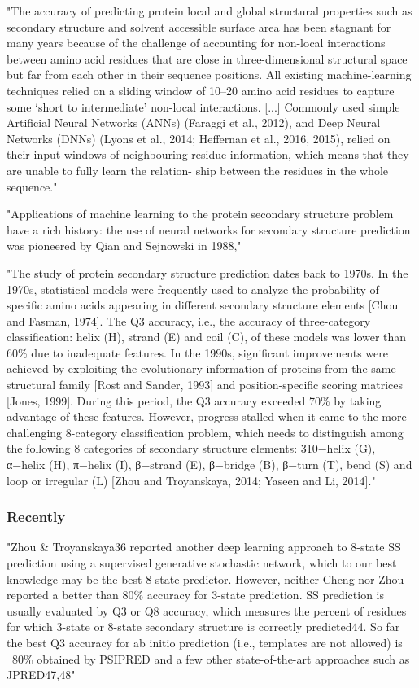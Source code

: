 	"The accuracy of predicting protein local and global structural properties such as secondary structure and solvent accessible surface area has been stagnant for many years because of the challenge of accounting for non-local interactions between amino acid residues that are close in three-dimensional structural space but far from each other in their sequence positions. All existing machine-learning techniques relied on a sliding window of 10–20 amino acid residues to capture some ‘short to intermediate’ non-local interactions. [...] Commonly used simple Artificial Neural Networks (ANNs) (Faraggi et al., 2012), and Deep Neural Networks (DNNs) (Lyons et al., 2014; Heffernan et al., 2016, 2015), relied on their input windows of neighbouring residue information, which means that they are unable to fully learn the relation- ship between the residues in the whole sequence." \cite{Heffernan2017}

	"Applications of machine learning to the protein secondary structure problem have a rich history: the use of neural networks for secondary structure prediction was pioneered by Qian and Sejnowski in 1988," \cite{Busia2017}
	
	"The study of protein secondary structure prediction dates back to 1970s. In the 1970s, statistical models were frequently used to analyze the probability of specific amino acids appearing in different secondary structure elements [Chou and Fasman, 1974]. The Q3 accuracy, i.e., the accuracy of three-category classification: helix (H), strand (E) and coil (C), of these models was lower than 60\% due to inadequate features. In the 1990s, significant improvements were achieved by exploiting the evolutionary information of proteins from the same structural family [Rost and Sander, 1993] and position-specific scoring matrices [Jones, 1999]. During this period, the Q3 accuracy exceeded 70\% by taking advantage of these features. However, progress stalled when it came to the more challenging 8-category classification problem, which needs to distinguish among the following 8 categories of secondary structure elements: 310−helix (G), α−helix (H), π−helix (I), β−strand (E), β−bridge (B), β−turn (T), bend (S) and loop or irregular (L) [Zhou and Troyanskaya, 2014; Yaseen and Li, 2014]." \cite{Li2016}

	\subsubsection{Recently}
	"Zhou \& Troyanskaya36 reported another deep learning approach to 8-state SS prediction using a supervised generative stochastic network, which to our best knowledge may be the best 8-state predictor. However, neither Cheng nor Zhou reported a better than 80\% accuracy for 3-state prediction. SS prediction is usually evaluated by Q3 or Q8 accuracy, which measures the percent of residues for which 3-state or 8-state secondary structure is correctly predicted44. So far the best Q3 accuracy for ab initio prediction (i.e., templates are not allowed) is ~80\% obtained by PSIPRED and a few other state-of-the-art approaches such as JPRED47,48" \cite{Wang2016}
	
